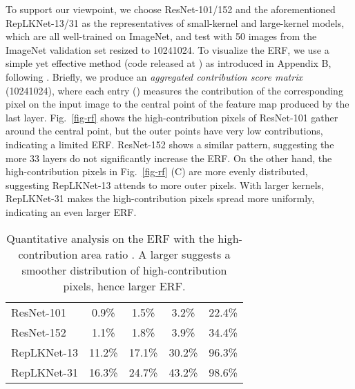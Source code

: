 \documentclass[10pt,twocolumn,letterpaper]{article}
\begin{document}
	To support our viewpoint, we choose ResNet-101/152 and the aforementioned RepLKNet-13/31 as the representatives of small-kernel and large-kernel models, which are all well-trained on ImageNet, and test with 50 images from the ImageNet validation set resized to 10241024. To visualize the ERF, we use a simple yet effective method (code released at \cite{RepLKNet-pytorch}) as introduced in Appendix B, following \cite{kim2021dead}. Briefly, we produce an \emph{aggregated contribution score matrix}  (10241024), where each entry  () measures the contribution of the corresponding pixel on the input image to the central point of the feature map produced by the last layer. Fig.~\ref{fig-rf} shows the high-contribution pixels of ResNet-101 gather around the central point, but the outer points have very low contributions, indicating a limited ERF. ResNet-152 shows a similar pattern, suggesting the more 33 layers do not significantly increase the ERF. On the other hand, the high-contribution pixels in Fig.~\ref{fig-rf} (C) are more evenly distributed, suggesting RepLKNet-13 attends to more outer pixels. With larger kernels, RepLKNet-31 makes the high-contribution pixels spread more uniformly, indicating an even larger ERF. 
	
		\setlength{\tabcolsep}{4pt}
	\begin{table}[t]
		\caption{Quantitative analysis on the ERF with the high-contribution area ratio . A larger  suggests a smoother distribution of high-contribution pixels, hence larger ERF.}
		\label{table-rf}
		\vspace{-0.2in}
		\begin{center}
			\small
			\begin{tabular}{lcccc}
				\hline
				& 		&				&		&	\\
				\hline
				ResNet-101		&	0.9\%		&	1.5\%	&	3.2\%	& 22.4\%	\\
				ResNet-152		&	1.1\%		&	1.8\%	&	3.9\%	& 34.4\%\\
				RepLKNet-13		&	11.2\%		&	17.1\%	&	30.2\%	&	96.3\%\\		
				RepLKNet-31		&	16.3\%		&	24.7\%	&   43.2\%	&	98.6\%	\\
				\hline
			\end{tabular}
			
		\end{center}
		\vspace{-0.2in}
	\end{table}
	
\end{document}
